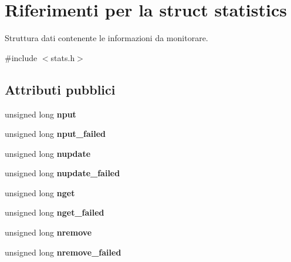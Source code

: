 \hypertarget{structstatistics}{}\section{Riferimenti per la struct statistics}
\label{structstatistics}


Struttura dati contenente le informazioni da monitorare.  




{\ttfamily \#include $<$stats.\+h$>$}

\subsection*{Attributi pubblici}
\begin{DoxyCompactItemize}
\item 
unsigned long {\bfseries nput}\hypertarget{structstatistics_af6052d60054e79a5e9bd38f11f1cc9bb}{}\label{structstatistics_af6052d60054e79a5e9bd38f11f1cc9bb}

\item 
unsigned long {\bfseries nput\+\_\+failed}\hypertarget{structstatistics_a526a898e02c6d4203017b39c8feae13c}{}\label{structstatistics_a526a898e02c6d4203017b39c8feae13c}

\item 
unsigned long {\bfseries nupdate}\hypertarget{structstatistics_a0dc1842056c05fa05f5e14263be33a59}{}\label{structstatistics_a0dc1842056c05fa05f5e14263be33a59}

\item 
unsigned long {\bfseries nupdate\+\_\+failed}\hypertarget{structstatistics_aa3bd8bc20aa8f030176e02c30af18472}{}\label{structstatistics_aa3bd8bc20aa8f030176e02c30af18472}

\item 
unsigned long {\bfseries nget}\hypertarget{structstatistics_a2c4b6cf66f83483b398a435c9e5c07b8}{}\label{structstatistics_a2c4b6cf66f83483b398a435c9e5c07b8}

\item 
unsigned long {\bfseries nget\+\_\+failed}\hypertarget{structstatistics_a43380fe734194d3d48ec83e8348f5de8}{}\label{structstatistics_a43380fe734194d3d48ec83e8348f5de8}

\item 
unsigned long {\bfseries nremove}\hypertarget{structstatistics_a586a706595dcc11bcbdd144f7c475bd7}{}\label{structstatistics_a586a706595dcc11bcbdd144f7c475bd7}

\item 
unsigned long {\bfseries nremove\+\_\+failed}\hypertarget{structstatistics_a6fcfd080f00c8293af00625a0719b44d}{}\label{structstatistics_a6fcfd080f00c8293af00625a0719b44d}


\end{DoxyCompactItemize}
